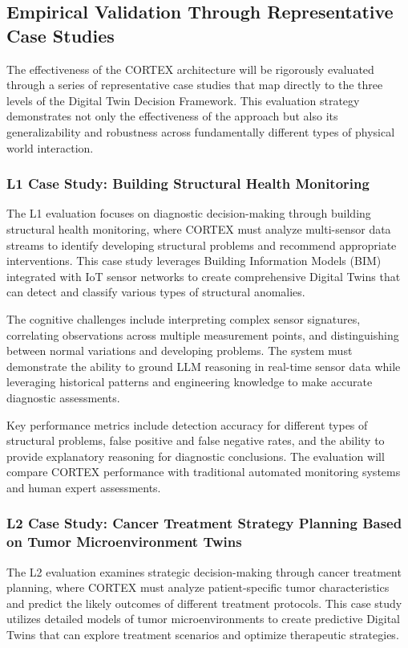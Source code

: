 \subsection{Empirical Validation Through Representative Case Studies}

The effectiveness of the CORTEX architecture will be rigorously evaluated through a series of representative case studies that map directly to the three levels of the Digital Twin Decision Framework. This evaluation strategy demonstrates not only the effectiveness of the approach but also its generalizability and robustness across fundamentally different types of physical world interaction.

\subsubsection{L1 Case Study: Building Structural Health Monitoring}

The L1 evaluation focuses on diagnostic decision-making through building structural health monitoring, where CORTEX must analyze multi-sensor data streams to identify developing structural problems and recommend appropriate interventions. This case study leverages Building Information Models (BIM) integrated with IoT sensor networks to create comprehensive Digital Twins that can detect and classify various types of structural anomalies.

The cognitive challenges include interpreting complex sensor signatures, correlating observations across multiple measurement points, and distinguishing between normal variations and developing problems. The system must demonstrate the ability to ground LLM reasoning in real-time sensor data while leveraging historical patterns and engineering knowledge to make accurate diagnostic assessments.

Key performance metrics include detection accuracy for different types of structural problems, false positive and false negative rates, and the ability to provide explanatory reasoning for diagnostic conclusions. The evaluation will compare CORTEX performance with traditional automated monitoring systems and human expert assessments.

\subsubsection{L2 Case Study: Cancer Treatment Strategy Planning Based on Tumor Microenvironment Twins}

The L2 evaluation examines strategic decision-making through cancer treatment planning, where CORTEX must analyze patient-specific tumor characteristics and predict the likely outcomes of different treatment protocols. This case study utilizes detailed models of tumor microenvironments to create predictive Digital Twins that can explore treatment scenarios and optimize therapeutic strategies.

